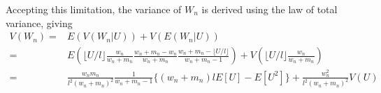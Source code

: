 \documentclass{article}
\begin{document}
\begin{appendices}
{Accepting this limitation, the variance of $W_n$ is derived using the law of total variance, giving
\begin{equation*}
    \begin{split}
    V(W_n)=&E(V(W_n|U))+V(E(W_n|U))\\
    =&E\left(\lfloor U/l \rfloor\frac{w_n}{w_n+m_n}\frac{w_n+m_n-w_n}{w_n+m_n}\frac{w_n+m_n-\lfloor U/l \rfloor}{w_n+m_n-1}\right)+V\left(\lfloor U/l \rfloor\frac{w_n}{w_n+m_n}\right)\\
    =&\frac{w_nm_n}{l^2(w_n+m_n)^2}\frac{1}{w_n+m_n-1}\{(w_n+m_n)lE[U]-E[U^2]\}+\frac{w_n^2}{l^2(w_n+m_n)^2}V(U)
    \end{split}
\end{equation*}

}
\end{appendices}
\end{document}
